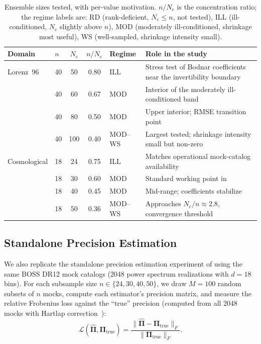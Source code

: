 \begin{table}[t]
\centering
\caption{Ensemble sizes tested, with per-value motivation. $n/N_e$ is the concentration ratio; the regime labels are: RD (rank-deficient, $N_e \leq n$, not tested), ILL (ill-conditioned, $N_e$ slightly above $n$), MOD (moderately ill-conditioned, shrinkage most useful), WS (well-sampled, shrinkage intensity small).}
\label{tab:ensemble_sizes}
\small
\begin{tabular}{@{}llccll@{}}
\toprule
Domain & $n$ & $N_e$ & $n/N_e$ & Regime & Role in the study \\
\midrule
Lorenz~96    & 40 & 50  & 0.80 & ILL    & Stress test of Bodnar coefficients near the invertibility boundary \\
             & 40 & 60  & 0.67 & MOD    & Interior of the moderately ill-conditioned band \\
             & 40 & 80  & 0.50 & MOD    & Upper interior; RMSE transition point \\
             & 40 & 100 & 0.40 & MOD--WS & Largest tested; shrinkage intensity small but non-zero \\
\midrule
Cosmological & 18 & 24  & 0.75 & ILL    & Matches operational mock-catalog availability~\citep{looijmans2024comparison} \\
             & 18 & 30  & 0.60 & MOD    & Standard working point in~\citet{looijmans2024comparison} \\
             & 18 & 40  & 0.45 & MOD    & Mid-range; coefficients stabilize \\
             & 18 & 50  & 0.36 & MOD--WS & Approaches $N_e/n \approx 2.8$, convergence threshold \\
\bottomrule
\end{tabular}
\end{table}

\subsection{Standalone Precision Estimation}
\label{sec:standalone_setup}

We also replicate the standalone precision estimation experiment of \citep{looijmans2024comparison} using the same BOSS DR12 mock catalogs (2048 power spectrum realizations with $d = 18$ bins). For each subsample size $n \in \{24, 30, 40, 50\}$, we draw $M = 100$ random subsets of $n$ mocks, compute each estimator's precision matrix, and measure the relative Frobenius loss against the ``true'' precision (computed from all 2048 mocks with Hartlap correction~\citep{hartlap2007your}):
\begin{equation}
\label{eq:matrix_loss}
\mathcal{L}(\hat{\boldsymbol{\Pi}}, \boldsymbol{\Pi}_{\text{true}}) = \frac{\|\hat{\boldsymbol{\Pi}} - \boldsymbol{\Pi}_{\text{true}}\|_F}{\|\boldsymbol{\Pi}_{\text{true}}\|_F}.
\end{equation}

